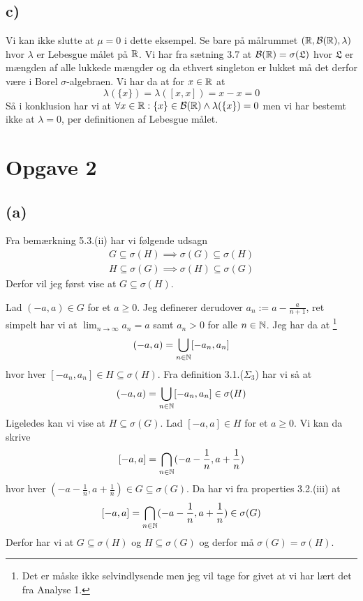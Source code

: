 \documentclass{article}
\begin{document}
\subsection*{c)}
Vi kan ikke slutte at $\mu=0$ i dette eksempel.
Se bare på målrummet $(\mathbb{R}, \mathcal{B}(\mathbb{R}), \lambda)$ 
hvor $\lambda$ er Lebesgue målet på $\mathbb{R}$. Vi har fra sætning 3.7 \cite{lim} at
$\mathcal{B}(\mathbb{R}) = \sigma(\mathfrak{L})$ hvor $\mathfrak{L}$ er mængden af alle lukkede
mængder og da ethvert singleton er lukket må det derfor være i Borel $\sigma$-algebraen.
Vi har da at for $x \in \mathbb{R}$ at
\[
    \lambda(\{x\}) = \lambda([x,x]) = x-x = 0
\]
Så i konklusion har vi at $\forall x \in \mathbb{R} : \{x\} \in \mathcal{B}(\mathbb{R}) \land \lambda(\{x\}) = 0$
men vi har bestemt ikke at $\lambda = 0$, per definitionen af Lebesgue målet.

\section*{Opgave 2}
\subsection*{(a)}
Fra bemærkning 5.3.(ii) \cite{lim} har vi følgende udsagn
\begin{align*}
    G \subseteq \sigma(H) \implies \sigma(G) \subseteq \sigma(H)  \\
    H \subseteq \sigma(G) \implies \sigma(H) \subseteq \sigma(G)
\end{align*}
Derfor vil jeg først vise at $G \subseteq \sigma(H)$.

Lad $(-a, a) \in G$ for et $a \ge 0$.
Jeg definerer derudover $a_{n} := a - \frac{a}{n+1}$, ret simpelt har vi at 
$\lim_{n \to \infty} a_{n} = a$ samt $a_n > 0$ for alle $n \in \mathbb{N}$. Jeg har da at
\footnote{Det er måske ikke selvindlysende men jeg vil tage for 
givet at vi har lært det fra Analyse 1.} 
\[
    (-a,a) = \bigcup_{n \in \mathbb{N}} [ -a_n  , a_n]
\]
hvor hver $[ -a_n  , a_n] \in H \subseteq \sigma(H)$.
Fra definition 3.1.($\Sigma_3$) \cite{lim} har vi så at 
\[
(-a,a) = \bigcup_{n \in \mathbb{N}} [- a_n, a_n ] \in \sigma(H)
\]
Ligeledes kan vi vise at $H \subseteq \sigma(G)$.
Lad $[-a, a] \in H$ for et $a \ge 0$. Vi kan da skrive 
\[
    [-a, a] = \bigcap_{n \in \mathbb{N}} (-a - \frac{1}{n}, a + \frac{1}{n})
\]
hvor hver
$(-a - \frac{1}{n}, a + \frac{1}{n}) \in G \subseteq \sigma(G)$.
Da har vi fra properties 3.2.(iii) \cite{lim} at
\[
    [-a, a] = \bigcap_{n \in \mathbb{N}} (-a - \frac{1}{n}, a + \frac{1}{n}) \in \sigma(G)
\]
Derfor har vi at $G \subseteq \sigma(H)$ og $H \subseteq \sigma(G)$ og derfor må
$\sigma(G) = \sigma(H)$.
\end{document}
